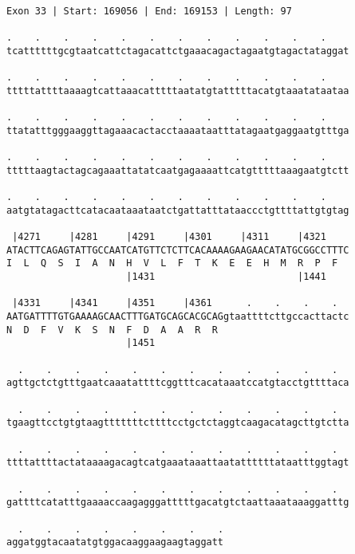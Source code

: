 \documentclass{article}
\begin{document}
\newpage
\begin{Verbatim}[fontfamily=courier]
Exon 33 | Start: 169056 | End: 169153 | Length: 97

.    .    .    .    .    .    .    .    .    .    .    .    
tcattttttgcgtaatcattctagacattctgaaacagactagaatgtagactataggat

.    .    .    .    .    .    .    .    .    .    .    .    
tttttattttaaaagtcattaaacatttttaatatgtatttttacatgtaaatataataa

.    .    .    .    .    .    .    .    .    .    .    .    
ttatatttgggaaggttagaaacactacctaaaataatttatagaatgaggaatgtttga

.    .    .    .    .    .    .    .    .    .    .    .    
tttttaagtactagcagaaattatatcaatgagaaaattcatgtttttaaagaatgtctt

.    .    .    .    .    .    .    .    .    .    .    .    
aatgtatagacttcatacaataaataatctgattatttataaccctgttttattgtgtag

 |4271     |4281     |4291     |4301     |4311     |4321    
ATACTTCAGAGTATTGCCAATCATGTTCTCTTCACAAAAGAAGAACATATGCGGCCTTTC
I  L  Q  S  I  A  N  H  V  L  F  T  K  E  E  H  M  R  P  F  
                     |1431                         |1441    

 |4331     |4341     |4351     |4361      .    .    .    .  
AATGATTTTGTGAAAAGCAACTTTGATGCAGCACGCAGgtaattttcttgccacttactc
N  D  F  V  K  S  N  F  D  A  A  R  R                       
                     |1451                                  

  .    .    .    .    .    .    .    .    .    .    .    .  
agttgctctgtttgaatcaaatattttcggtttcacataaatccatgtacctgttttaca

  .    .    .    .    .    .    .    .    .    .    .    .  
tgaagttcctgtgtaagtttttttcttttcctgctctaggtcaagacatagcttgtctta

  .    .    .    .    .    .    .    .    .    .    .    .  
ttttattttactataaaagacagtcatgaaataaattaatattttttataatttggtagt

  .    .    .    .    .    .    .    .    .    .    .    .  
gattttcatatttgaaaaccaagagggatttttgacatgtctaattaaataaaggatttg

  .    .    .    .    .    .    .    .
aggatggtacaatatgtggacaaggaagaagtaggatt
\end{Verbatim}
\newpage
\end{document}
